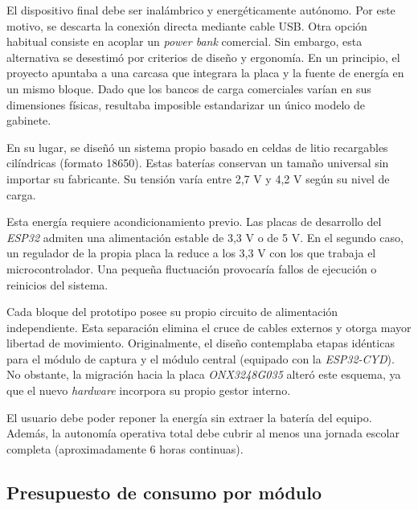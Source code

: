 El dispositivo final debe ser inalámbrico y energéticamente autónomo. Por este motivo, se descarta la conexión directa mediante cable USB. Otra opción habitual consiste en acoplar un \emph{power bank} comercial. Sin embargo, esta alternativa se desestimó por criterios de diseño y ergonomía. En un principio, el proyecto apuntaba a una carcasa que integrara la placa y la fuente de energía en un mismo bloque. Dado que los bancos de carga comerciales varían en sus dimensiones físicas, resultaba imposible estandarizar un único modelo de gabinete.

En su lugar, se diseñó un sistema propio basado en celdas de litio recargables cilíndricas (formato 18650). Estas baterías conservan un tamaño universal sin importar su fabricante. Su tensión varía entre 2,7 V y 4,2 V según su nivel de carga.

Esta energía requiere acondicionamiento previo. Las placas de desarrollo del \emph{ESP32} admiten una alimentación estable de 3,3 V o de 5 V. En el segundo caso, un regulador de la propia placa la reduce a los 3,3 V con los que trabaja el microcontrolador. Una pequeña fluctuación provocaría fallos de ejecución o reinicios del sistema. 

Cada bloque del prototipo posee su propio circuito de alimentación independiente. Esta separación elimina el cruce de cables externos y otorga mayor libertad de movimiento. Originalmente, el diseño contemplaba etapas idénticas para el módulo de captura y el módulo central (equipado con la \emph{ESP32-CYD}). No obstante, la migración hacia la placa \emph{ONX3248G035} alteró este esquema, ya que el nuevo \emph{hardware} incorpora su propio gestor interno. 

El usuario debe poder reponer la energía sin extraer la batería del equipo. Además, la autonomía operativa total debe cubrir al menos una jornada escolar completa (aproximadamente 6 horas continuas).

\subsection{Presupuesto de consumo por módulo}

